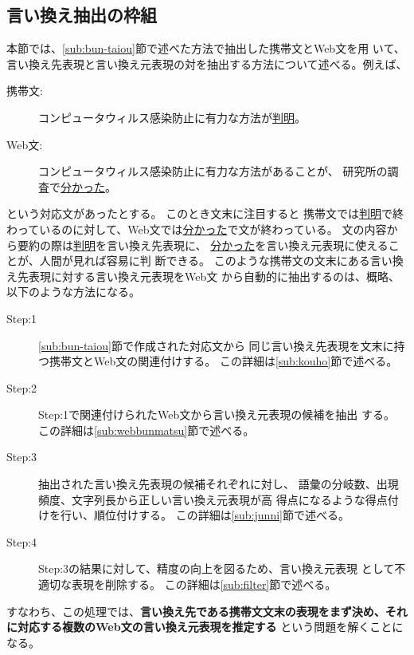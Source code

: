 \documentclass[jnlpbbl]{jnlp_j}
\begin{document}
\subsection{言い換え抽出の枠組}
本節では、\ref{sub:bun-taiou}節で述べた方法で抽出した携帯文とWeb文を用
いて、
言い換え先表現と言い換え元表現の対を抽出する方法について述べる。例えば、\\
\begin{description}
\item[携帯文:]コンピュータウィルス感染防止に有力な方法が\underline{判明}。
\item[Web文:]コンピュータウィルス感染防止に有力な方法があることが、
研究所の調査で\underline{分かった}。\\
\end{description}

という対応文があったとする。
このとき文末に注目すると
携帯文では\underline{判明}で終わっているのに対して、Web文では\underline
{分かった}で文が終わっている。
文の内容から要約の際は\underline{判明}を言い換え先表現に、
\underline{分かった}を言い換え元表現に使えることが、人間が見れば容易に判
断できる。
このような携帯文の文末にある言い換え先表現に対する言い換え元表現をWeb文
から自動的に抽出するのは、概略、以下のような方法になる。\\

\begin{description}
\item[Step:1] \ref{sub:bun-taiou}節で作成された対応文から
	   同じ言い換え先表現を文末に持つ携帯文とWeb文の関連付けする。
	   この詳細は\ref{sub:kouho}節で述べる。

\item[Step:2] Step:1で関連付けられたWeb文から言い換え元表現の候補を抽出
	   する。
	   この詳細は\ref{sub:webbunmatsu}節で述べる。

\item[Step:3] 抽出された言い換え先表現の候補それぞれに対し、
	   語彙の分岐数、出現頻度、文字列長から正しい言い換え元表現が高
	   得点になるような得点付けを行い、順位付けする。
	   この詳細は\ref{sub:junni}節で述べる。

\item[Step:4] Step:3の結果に対して、精度の向上を図るため、言い換え元表現
	   として不適切な表現を削除する。
	   この詳細は\ref{sub:filter}節で述べる。
\\
\end{description} 


すなわち、この処理では、\textbf{言い換え先である携帯文文末の表現をまず決め、それに対応する複数のWeb文の言い換え元表現を推定する} という問題を解くことになる。
\end{document}
